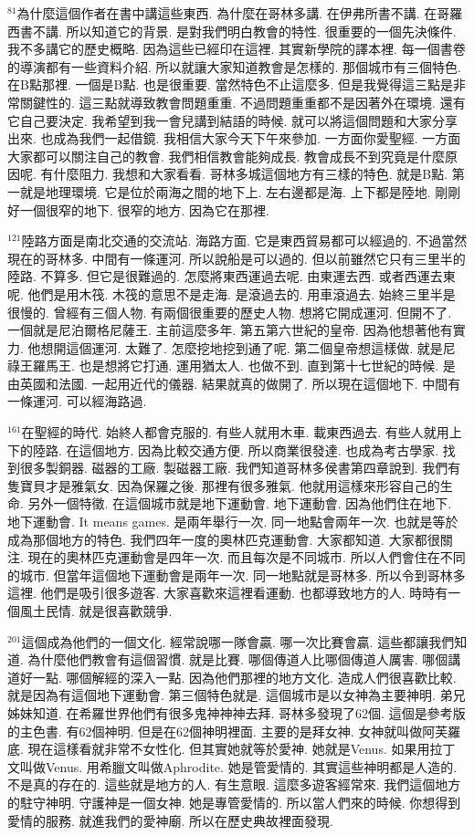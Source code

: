 \documentclass{book}
\begin{document}
$^{81}$為什麼這個作者在書中講這些東西.
為什麼在哥林多講.
在伊弗所書不講.
在哥羅西書不講.
所以知道它的背景.
是對我們明白教會的特性.
很重要的一個先決條件.
我不多講它的歷史概略.
因為這些已經印在這裡.
其實新學院的譯本裡.
每一個書卷的導演都有一些資料介紹.
所以就讓大家知道教會是怎樣的.
那個城市有三個特色.
在B點那裡.
一個是B點.
也是很重要.
當然特色不止這麼多.
但是我覺得這三點是非常關鍵性的.
這三點就導致教會問題重重.
不過問題重重都不是因著外在環境.
還有它自己要決定.
我希望到我一會兒講到結語的時候.
就可以將這個問題和大家分享出來.
也成為我們一起借鏡.
我相信大家今天下午來參加.
一方面你愛聖經.
一方面大家都可以關注自己的教會.
我們相信教會能夠成長.
教會成長不到究竟是什麼原因呢.
有什麼阻力.
我想和大家看看.
哥林多城這個地方有三樣的特色.
就是B點.
第一就是地理環境.
它是位於兩海之間的地下上.
左右邊都是海.
上下都是陸地.
剛剛好一個很窄的地下.
很窄的地方.
因為它在那裡.

$^{121}$陸路方面是南北交通的交流站.
海路方面.
它是東西貿易都可以經過的.
不過當然現在的哥林多.
中間有一條運河.
所以說船是可以過的.
但以前雖然它只有三里半的陸路.
不算多.
但它是很難過的.
怎麼將東西運過去呢.
由東運去西.
或者西運去東呢.
他們是用木筏.
木筏的意思不是走海.
是滾過去的.
用車滾過去.
始終三里半是很慢的.
曾經有三個人物.
有兩個很重要的歷史人物.
想將它開成運河.
但開不了.
一個就是尼泊爾格尼薩王.
主前這麼多年.
第五第六世紀的皇帝.
因為他想著他有實力.
他想開這個運河.
太難了.
怎麼挖地挖到通了呢.
第二個皇帝想這樣做.
就是尼祿王羅馬王.
也是想將它打通.
運用猶太人.
也做不到.
直到第十七世紀的時候.
是由英國和法國.
一起用近代的儀器.
結果就真的做開了.
所以現在這個地下.
中間有一條運河.
可以經海路過.

$^{161}$在聖經的時代.
始終人都會克服的.
有些人就用木車.
載東西過去.
有些人就用上下的陸路.
在這個地方.
因為比較交通方便.
所以商業很發達.
也成為考古學家.
找到很多製銅器.
磁器的工廠.
製磁器工廠.
我們知道哥林多侯書第四章說到.
我們有隻寶貝才是雅氣女.
因為保羅之後.
那裡有很多雅氣.
他就用這樣來形容自己的生命.
另外一個特徵.
在這個城市就是地下運動會.
地下運動會.
因為他們住在地下.
地下運動會.
It means games.
是兩年舉行一次.
同一地點會兩年一次.
也就是等於成為那個地方的特色.
我們四年一度的奧林匹克運動會.
大家都知道.
大家都很關注.
現在的奧林匹克運動會是四年一次.
而且每次是不同城市.
所以人們會住在不同的城市.
但當年這個地下運動會是兩年一次.
同一地點就是哥林多.
所以令到哥林多這裡.
他們是吸引很多遊客.
大家喜歡來這裡看運動.
也都導致地方的人.
時時有一個風土民情.
就是很喜歡競爭.

$^{201}$這個成為他們的一個文化.
經常說哪一隊會贏.
哪一次比賽會贏.
這些都讓我們知道.
為什麼他們教會有這個習慣.
就是比賽.
哪個傳道人比哪個傳道人厲害.
哪個講道好一點.
哪個解經的深入一點.
因為他們那裡的地方文化.
造成人們很喜歡比較.
就是因為有這個地下運動會.
第三個特色就是.
這個城市是以女神為主要神明.
弟兄姊妹知道.
在希羅世界他們有很多鬼神神神去拜.
哥林多發現了62個.
這個是參考版的主色書.
有62個神明.
但是在62個神明裡面.
主要的是拜女神.
女神就叫做阿芙羅底.
現在這樣看就非常不女性化.
但其實她就等於愛神.
她就是Venus.
如果用拉丁文叫做Venus.
用希臘文叫做Aphrodite.
她是管愛情的.
其實這些神明都是人造的.
不是真的存在的.
這些就是地方的人.
有生意眼.
這麼多遊客經常來.
我們這個地方的駐守神明.
守護神是一個女神.
她是專管愛情的.
所以當人們來的時候.
你想得到愛情的服務.
就進我們的愛神廟.
所以在歷史典故裡面發現.
\end{document}
